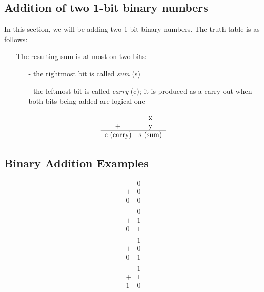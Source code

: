 \documentclass[12pt,openany, tikz,border=10pt]{book}
\begin{document}
\subsection{Addition of two 1-bit binary numbers}
In this section, we will be adding two 1-bit binary numbers. The truth table is as follows:
\begin{itemize}
    \item[] The resulting sum is at most on two bits:
    \begin{itemize}
        \item[-] the rightmost bit is called \textit{sum} (s)
        \item[-] the leftmost bit is called \textit{carry} (c); it is produced as a carry-out when both bits being added are logical one
    \end{itemize}
\end{itemize}


\[
    \begin{array}{cccccc}
        & $x$\\
        + & $y$ \\
        \hline
        $c (carry)$ & $s (sum)$ \\
    \end{array}
    \]
    
\subsection{Binary Addition Examples}

\[
\begin{array}{cccccc}
 & 0\\
+ & 0 \\
\hline
0 & 0 \\
\end{array}
\]
\[
\begin{array}{cccccc}
 & 0\\
+ & 1 \\
\hline
0 & 1 \\
\end{array}
\]
\[
\begin{array}{cccccc}
 & 1\\
+ & 0 \\
\hline
0 & 1 \\
\end{array}
\]
\[
\begin{array}{cccccc}
 & 1\\
+ & 1 \\
\hline
1 & 0 \\
\end{array}
\]
\end{document}

